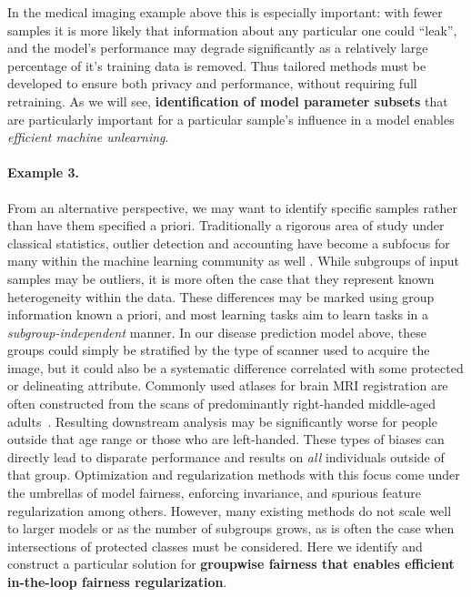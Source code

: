 In the medical imaging example above this is especially important: with fewer samples it is more likely that information about any particular one could ``leak'', and the model's performance may degrade significantly as a relatively large percentage of it's training data is removed.
Thus tailored methods must be developed to ensure both privacy and performance, without requiring full retraining.
As we will see, 
\textbf{identification of model parameter subsets}
that are particularly important
for a particular sample's influence
in a model enables \textit{efficient machine unlearning}.

\paragraph{Example 3.}
From an alternative perspective, we may want to identify specific samples rather than have them specified a priori.
Traditionally a rigorous area of study under classical statistics, outlier detection and accounting have become a subfocus for many within the machine learning community as well \citep{golatkar2020eternal,golatkar2020forgetting,huang2020feature,ren2019likelihood}.
While subgroups of input samples may be outliers, it is more often the case that they represent known heterogeneity within the data. 
These differences may be marked using 
group information known a priori, and 
most learning tasks aim to learn tasks
in a \textit{subgroup-independent} manner.
In our disease prediction model above,
these groups could simply be stratified by the type of scanner used to acquire the image, but it could also
be a systematic difference correlated with some protected or delineating attribute.
Commonly used atlases for brain MRI registration are often constructed
from the scans of predominantly right-handed middle-aged adults~\citep{FONOV2009S102}.
Resulting downstream analysis may be significantly worse
for people outside that age range or those who are left-handed.
These types of biases can directly lead to disparate performance and results on \textit{all} individuals outside of that group.
Optimization and regularization methods with this focus come under the umbrellas of model fairness, enforcing invariance, and spurious feature regularization among others.
However, many existing methods do not scale well to larger models or as the number of subgroups grows,
as is often the case when intersections of protected classes must be considered.
Here we identify and construct a particular solution for \textbf{groupwise fairness that enables efficient in-the-loop fairness regularization}.

